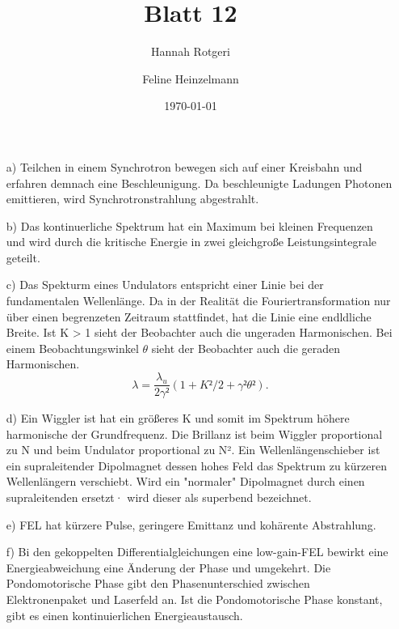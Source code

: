 \documentclass[11pt,a4paper]{article}
\title{Blatt 12}
\date{\today}
\author{Hannah Rotgeri \and Feline Heinzelmann}
\begin{document}
    \maketitle


	\begin{itemize}
		\item[a)] 
			Teilchen in einem Synchrotron bewegen sich auf einer Kreisbahn
			und erfahren demnach eine Beschleunigung.
			Da beschleunigte Ladungen Photonen emittieren,
			wird Synchrotronstrahlung abgestrahlt.

		\item[b)]
			Das kontinuerliche Spektrum hat ein Maximum bei kleinen Frequenzen und 
			wird durch die kritische Energie in zwei gleichgroße Leistungsintegrale geteilt.

		\item[c)] 
			Das Spekturm eines Undulators entspricht einer Linie bei der fundamentalen Wellenlänge.
			Da in der Realität die Fouriertransformation nur über einen begrenzeten Zeitraum stattfindet,
			hat die Linie eine endldliche Breite.
			Ist K > 1 sieht der Beobachter auch die ungeraden Harmonischen.
			Bei einem Beobachtungswinkel $\theta$ sieht der Beobachter auch die geraden Harmonischen.
			\begin{equation}
				\lambda = \frac{\lambda_u}{2 \gamma ²} (1 + K²/2 + \gamma² \theta²).
			\end{equation}

		\item[d)]
			Ein Wiggler ist hat ein größeres K und somit im Spektrum höhere harmonische der Grundfrequenz.
			Die Brillanz ist beim Wiggler proportional zu N und beim Undulator proportional zu N².
			Ein Wellenlängenschieber ist ein supraleitender Dipolmagnet dessen hohes Feld das Spektrum zu kürzeren Wellenlängern verschiebt.
			Wird ein "normaler" Dipolmagnet durch einen supraleitenden ersetzt· wird dieser als superbend bezeichnet.

		\item[e)]
			FEL hat kürzere Pulse, geringere Emittanz und kohärente Abstrahlung.
		
		\item[f)]
			Bi den gekoppelten Differentialgleichungen eine low-gain-FEL bewirkt eine Energieabweichung eine Änderung der Phase und umgekehrt.
			Die Pondomotorische Phase gibt den Phasenunterschied zwischen Elektronenpaket und Laserfeld an.
			Ist die Pondomotorische Phase konstant, gibt es einen kontinuierlichen Energieaustausch.
		

\end{itemize}
\end{document}
